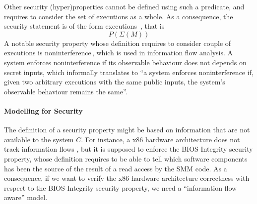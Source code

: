 Other security (hyper)properties cannot be defined using such a predicate, and
requires to consider the set of executions as a whole. As a consequence, the
security statement is of the form executions\,\cite{clarkson2010hyperproperties}
, that is
%
\[
  P(\Sigma(M))
\]
%
A notable security property whose definition requires to consider couple of
executions is noninterference\,\cite{goguen1982security}, which is used in
information flow analysis.
%
A system enforces noninterference if its observable behaviour does not depends
on secret inputs, which informally translates to ``a system enforces
noninterference if, given two arbitrary executions with the same public inputs,
the system's observable behaviour remains the same''. 

\paragraph{Modelling for Security}
%
The definition of a security property might  be
based on information that are not available to the system $C$.
%
For instance, a x86 hardware architecture does not track information flows
, but it is supposed to enforce the
BIOS Integrity security property, whose definition requires to be able to tell
which software components has been the source of the result of a read access by
the SMM code. 
%
As a consequence, if we want to verify the x86 hardware architecture correctness
with respect to the BIOS Integrity security property, we need a ``information
flow aware'' model. 

